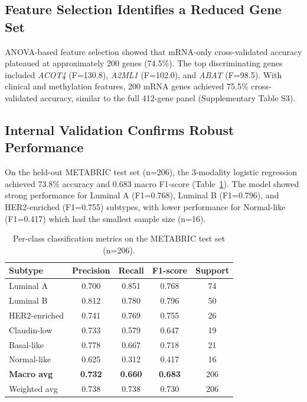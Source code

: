 \documentclass[11pt,a4paper]{article}
\begin{document}
\subsection{Feature Selection Identifies a Reduced Gene Set}
\label{sec:feature_selection}

ANOVA-based feature selection showed that mRNA-only cross-validated accuracy plateaued at approximately 200 genes (74.5\%). The top discriminating genes included \textit{ACOT4} (F=130.8), \textit{A2ML1} (F=102.0), and \textit{ABAT} (F=98.5). With clinical and methylation features, 200 mRNA genes achieved 75.5\% cross-validated accuracy, similar to the full 412-gene panel (Supplementary Table S3).

\subsection{Internal Validation Confirms Robust Performance}
\label{sec:internal}

On the held-out METABRIC test set (n=206), the 3-modality logistic regression achieved 73.8\% accuracy and 0.683 macro F1-score (Table~\ref{tab:internal_per_class}). The model showed strong performance for Luminal A (F1=0.768), Luminal B (F1=0.796), and HER2-enriched (F1=0.755) subtypes, with lower performance for Normal-like (F1=0.417) which had the smallest sample size (n=16).

\begin{table}[H]
\centering
\caption{Per-class classification metrics on the METABRIC test set (n=206).}
\label{tab:internal_per_class}
\begin{tabular}{lcccc}
\toprule
\textbf{Subtype} & \textbf{Precision} & \textbf{Recall} & \textbf{F1-score} & \textbf{Support} \\
\midrule
Luminal A & 0.700 & 0.851 & 0.768 & 74 \\
Luminal B & 0.812 & 0.780 & 0.796 & 50 \\
HER2-enriched & 0.741 & 0.769 & 0.755 & 26 \\
Claudin-low & 0.733 & 0.579 & 0.647 & 19 \\
Basal-like & 0.778 & 0.667 & 0.718 & 21 \\
Normal-like & 0.625 & 0.312 & 0.417 & 16 \\
\midrule
\textbf{Macro avg} & \textbf{0.732} & \textbf{0.660} & \textbf{0.683} & 206 \\
Weighted avg & 0.738 & 0.738 & 0.730 & 206 \\
\bottomrule
\end{tabular}
\end{table}
\end{document}
